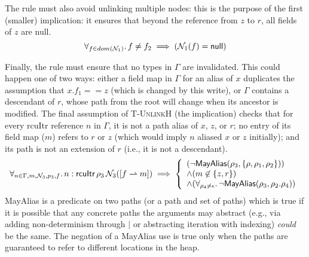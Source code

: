 The rule must also avoid unlinking multiple nodes: this is the purpose of the first (smaller) implication: it ensures that beyond the reference from $z$ to $r$, all fields of $z$ are null.
\[\forall_{f\in dom(\mathcal{N}_1)} \ldotp f\neq f_2 \implies (\mathcal{N}_1(f) = \textsf{null})\] 

Finally, the rule must ensure that no types in $\Gamma$ are invalidated.  This could happen one of two ways: either a field map in $\Gamma$ for an alias of $x$ duplicates the assumption that $x.f_1==z$ (which is changed by this write), or $\Gamma$ contains a descendant of $r$, whose path from the root will change when its ancestor is modified.
The final assumption of \textsc{T-UnlinkH} (the implication)
checks that for every \textsf{rcuItr} reference $n$ in $\Gamma$, it is not a path alias of $x$, $z$, or $r$; no entry of its field map ($m$) refers to $r$ or $z$ (which would imply $n$ aliased $x$ or $z$ initially); and its path is not an extension of $r$ (i.e., it is not a descendant).
\[
\begin{array}{l}
\forall_{n\in \Gamma,m,\N_3, p_3,f}\ldotp n:\textsf{rcuItr}\,\rho_3\,\N_3([f\rightharpoonup m]) \implies %
\left\{\begin{array}{l}
(\neg\mathsf{MayAlias}(\rho_3,\{\rho,\rho_1,\rho_2\}) ) \arcr
\land (m\not\in\{z,r\} ) \arcr
\land (\forall_{\rho_4\neq \epsilon} \ldotp \neg\mathsf{MayAlias}(\rho_3, \rho_2.\rho_4) )
\end{array}\right.
\end{array}
\]
\textsf{MayAlias} is a predicate on two paths (or a path and set of paths) which is true if it is possible that any concrete paths the arguments may abstract (e.g., via adding non-determinism through $|$ or abstracting iteration with indexing) \emph{could} be the same.  The negation of a \textsf{MayAlias} use is true only when the paths are guaranteed to refer to different locations in the heap.
